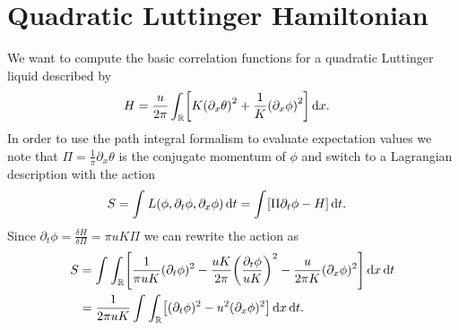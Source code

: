 \documentclass[english, parskip=full]{scrartcl}
\title{\titel}
\author{\autor}
\date{\today}
\begin{document}
\maketitle  %


\section{Quadratic Luttinger Hamiltonian}
We want to compute the basic correlation functions for a quadratic Luttinger liquid described by
\begin{align}
H &= \frac{u}{2\pi} \intr{\klb*{K\kla*{\partial_x\theta}^2 + \frac{1}{K} \kla*{\partial_x\phi}^2}}{x}.
\end{align}
In order to use the path integral formalism to evaluate expectation values we note that $\Pi = \frac{1}{\pi}\partial_x\theta$ is the conjugate momentum of $\phi$ and switch to a Lagrangian description with the action
\begin{align}
S &= \intx{}{}{L(\phi,\partial_t\phi, \partial_x\phi)}{t} = \intx{}{}{\klb*{\Pi\partial_t \phi - H}}{t}.
\end{align}
Since $\partial_t\phi = \frac{\delta H}{\delta \Pi} =\pi u K \Pi$ we can rewrite the action as
\begin{align}
S &= \intx{ }{ }{\intr{\klb*{\frac{1}{\pi uK} (\partial_t\phi)^2 - \frac{uK}{2\pi} \kla*{\frac{\partial_t\phi}{uK}}^2 - \frac{u}{2\pi K} (\partial_x\phi)^2}}{x} }{t}\\
&= \frac{1}{2\pi uK} \intx{ }{ }{\intr{\klb*{(\partial_t\phi)^2 - u^2 (\partial_x\phi)^2}}{x} }{t}.
\end{align}
\end{document}
